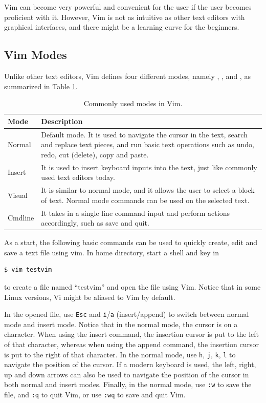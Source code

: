 Vim can become very powerful and convenient for the user if the user becomes proficient with it. However, Vim is not as intuitive as other text editors with graphical interfaces, and there might be a learning curve for the beginners.

\subsection{Vim Modes} \label{ch:tfe:subsec:vimgeneralintro}

Unlike other text editors, Vim defines four different modes, namely , ,  and , as summarized in Table \ref{ch:tfe:tab:vimmodes}.

\begin{table}[!htb]
  \centering \caption{Commonly used modes in Vim.}\label{ch:tfe:tab:vimmodes}
  \begin{tabularx}{\textwidth}{lX}
    \hline
    Mode & Description \\ \hline
    Normal & Default mode. It is used to navigate the cursor in the text, search and replace text pieces, and run basic text operations such as undo, redo, cut (delete), copy and paste. \\ 
    Insert & It is used to insert keyboard inputs into the text, just like commonly used text editors today. \\ 
    Visual & It is similar to normal mode, and it allows the user to select a block of text. Normal mode commands can be used on the selected text. \\ 
    Cmdline & It takes in a single line command input and perform actions accordingly, such as save and quit. \\
    \hline
  \end{tabularx}
\end{table}

As a start, the following basic commands can be used to quickly create, edit and save a text file using vim. In home directory, start a shell and key in
\begin{lstlisting}
$ vim testvim
\end{lstlisting}
to create a file named ``testvim'' and open the file using Vim. Notice that in some Linux versions, Vi might be aliased to Vim by default.

In the opened file, use \verb|Esc| and \verb|i|/\verb|a| (insert/append) to switch between normal mode and insert mode. Notice that in the normal mode, the cursor is on a character. When using the insert command, the insertion cursor is put to the left of that character, whereas when using the append command, the insertion cursor is put to the right of that character. In the normal mode, use \verb|h|, \verb|j|, \verb|k|, \verb|l| to navigate the position of the cursor. If a modern keyboard is used, the left, right, up and down arrows can also be used to navigate the position of the cursor in both normal and insert modes. Finally, in the normal mode, use \verb|:w| to save the file, and \verb|:q| to quit Vim, or use \verb|:wq| to save and quit Vim.

